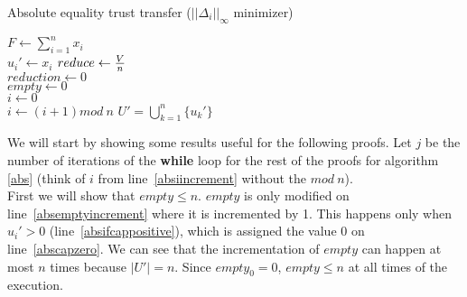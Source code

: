 \documentclass[11pt]{article}
\theoremstyle{definition}
\theoremstyle{corollary}
\theoremstyle{lemma}
\begin{document}
    \begin{algorithm}[H]
       \label{abs}
       \caption{Absolute equality trust transfer ($||\Delta_i||_\infty$ minimizer)}
       $F \gets \sum\limits_{i=1}^{n}x_i$ \\
          {$u_i' \gets x_i$ \label{abscapinit}}
       $reduce \gets {V \over n}$ \\
       $reduction \gets 0$ \\
       $empty \gets 0$ \\
       $i \gets 0$ \label{absiinit} \\
          {
           $i \gets (i + 1) mod \:n$ \label{absiincrement}}
       \Return $U' = \bigcup\limits_{k=1}^{n}\{u_k'\}$ \label{absreturn}
    \end{algorithm}
       \noindent
       We will start by showing some results useful for the following proofs. Let $j$ be the number of iterations of the
       \textbf{while} loop for the rest of the proofs for algorithm \ref{abs} (think of $i$ from line~\ref{absiincrement}
       without the $mod\:n$).\\
       First we will show that $empty \leq n$. $empty$ is only modified on line~\ref{absemptyincrement} where it is
       incremented by 1. This happens only when $u_i' > 0$ (line~\ref{absifcappositive}), which is assigned the value 0 on
       line~\ref{abscapzero}. We can see that the incrementation of $empty$ can happen at most $n$ times because
       $|U'| = n$. Since $empty_0 = 0$, $empty \leq n$ at all times of the execution. \\
\end{document}
